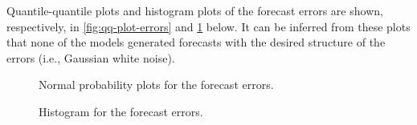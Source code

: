 
Quantile-quantile plots and histogram plots of the forecast errors are shown, respectively, in \cref{fig:qq-plot-errors} and \cref{fig:histogram_errors} below. It can be inferred from these plots that none of the models generated forecasts with the desired structure of the errors (i.e., Gaussian white noise).

\begin{figure}[h]
\centering
{}
\caption{Normal probability plots for the forecast errors.}
\label{fig:qq-plot-errors}
\vspace*{\floatsep}%
\caption{Histogram for the forecast errors.}
\label{fig:histogram_errors}
\end{figure}
